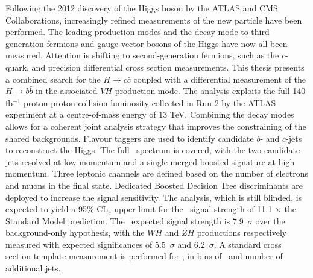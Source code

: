 Following the 2012 discovery of the Higgs boson by the ATLAS and CMS Collaborations, increasingly refined measurements of the new particle have been performed. The leading production modes and the decay mode to third-generation fermions and gauge vector bosons of the Higgs have now all been measured. Attention is shifting to second-generation fermions, such as the $c$-quark, and precision differential cross section measurements. This thesis presents a combined search for the $H \rightarrow c\bar{c}$ coupled with a differential measurement of the $H \rightarrow b\bar{b}$ in the associated $VH$ production mode. The analysis exploits the full 140 fb$^{-1}$ proton-proton collision luminosity collected in Run 2 by the ATLAS experiment at a centre-of-mass energy of 13 TeV. Combining the decay modes allows for a coherent joint analysis strategy that improves the constraining of the shared backgrounds. Flavour taggers are used to identify candidate $b$- and $c$-jets to reconstruct the Higgs. The full \pt\ spectrum is covered, with the two candidate jets resolved at low momentum and a single merged boosted signature at high momentum. Three leptonic channels are defined based on the number of electrons and muons in the final state. Dedicated Boosted Decision Tree discriminants are deployed to increase the signal sensitivity. The analysis, which is still blinded, is expected to yield a 95\% CL$_s$ upper limit for the \vhc\ signal strength of 11.1 $\times$ the Standard Model prediction. The \vhb\ expected signal strength is 7.9~$\sigma$ over the background-only hypothesis, with the $WH$ and $ZH$ productions respectively measured with expected significances of 5.5~$\sigma$ and 6.2~$\sigma$. A standard cross section template measurement is performed for \vhb, in bins of \pt\ and number of additional jets.
\vspace*{\fill}
    